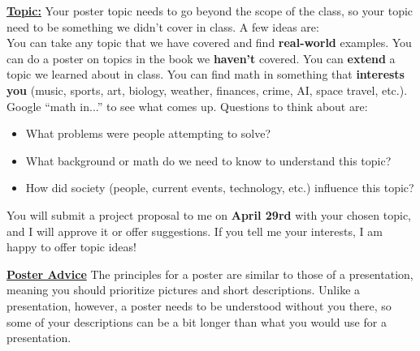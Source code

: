 \documentclass[12pt]{article}
\begin{document}
\textbf{\underline{Topic:}}
Your poster topic needs to go beyond the scope of the class, so your topic need to be something we didn't cover in class.  A few ideas are: \\ You can take any topic that we have covered and find \textbf{real-world} examples. You can do a poster on topics in the book we \textbf{haven't} covered. You can \textbf{extend} a topic we learned about in class.  You can find math in something that \textbf{interests you} (music, sports, art, biology, weather, finances, crime, AI, space travel, etc.). Google ``math in...'' to see what comes up. Questions to think about are:
\begin{itemize}
    \item What problems were people attempting to solve?
    \item What background or math do we need to know to understand this topic?
    \item How did society (people, current events, technology, etc.) influence this topic?
\end{itemize}

You will submit a project proposal to me on \textbf{April 29rd} with your chosen topic, and I will approve it or offer suggestions. If you tell me your interests, I am happy to offer topic ideas!\par

\textbf{\underline{Poster Advice}}
The principles for a poster are similar to those of a presentation, meaning you should prioritize pictures and short descriptions. Unlike a presentation, however, a poster needs to be understood without you there, so some of your descriptions can be a bit longer than what you would use for a presentation.
\end{document}
